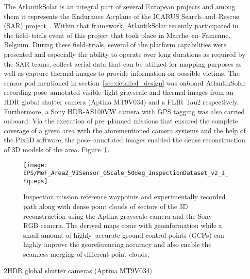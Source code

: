 
The AtlantikSolar is an integral part of several European projects and among them it represents the Endurance Airplane of the ICARUS Search--and--Rescue (SAR) project~\cite{ICARUSwebsite}. Within that framework, AtlantikSolar recently participated in the field--trials event of this project that took place in Marche--en--Famenne, Belgium. During these field--trials, several of the platform capabilities were presented and especially the ability to operate over long durations as required by the SAR teams, collect aerial data that can be utilized for mapping purposes as well as capture thermal images to provide information on possible victims. The sensor pod mentioned in section~\ref{sec:detailed_design} was onboard AtlantikSolar recording pose--annotated visible--light grayscale and thermal images from an HDR global shutter camera (Aptina MT9V034) and a FLIR Tau2 respectively. Furthermore, a Sony HDR-AS100VW camera with GPS tagging was also carried onboard. Via the execution of pre--planned missions that ensured the complete coverage of a given area with the aforementioned camera systems and the help of the Pix4D software, the pose--annotated images enabled the dense reconstruction of $3\textrm{D}$ models of the area. Figure~\ref{fig:mef_icarus_reconstruction}. 

%
\begin{figure}[htbp]
\begin{center}
  \texttt{[image: EPS/MeF\_Area2\_VISensor\_GScale\_50deg\_InspectionDataset\_v2\_1\_hq.eps]} %
\end{center}
\caption{Inspection mission reference waypoints and experimentally recorded path along with dense point clouds of sectors of the $3\textrm{D}$ reconstruction using the Aptina grayscale camera and the Sony RGB camera. The derived maps come with geoinformation while a small amount of highly--accurate ground control points (GCPs) can highly improve the georeferencing accuracy and also enable the seamless merging of different point clouds.  }
\label{fig:mef_icarus_reconstruction}
\end{figure}
%

2HDR global shutter cameras (Aptina MT9V034)